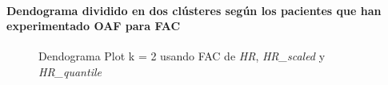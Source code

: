 \paragraph{Dendograma dividido en dos clústeres según los pacientes que han experimentado OAF para FAC}

\begin{figure}[H]
    \centering
    \caption{Dendograma Plot k = 2 usando FAC de \textit{HR}, \textit{HR\_scaled} y \textit{HR\_quantile}}\label{fig:acf_ctg_fc}
\end{figure}

